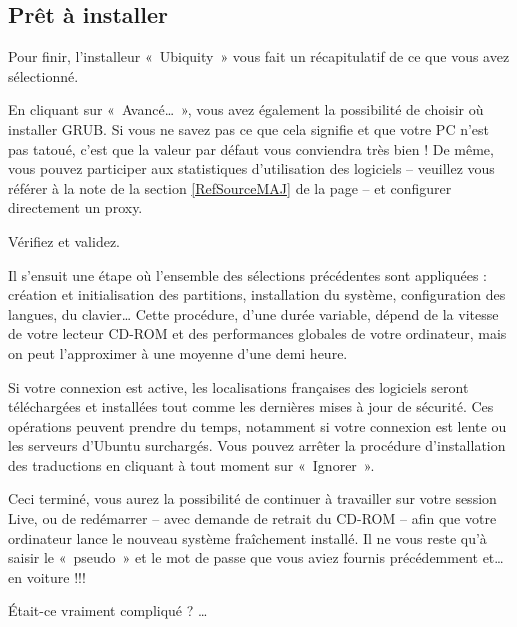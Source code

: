 \subsection{Prêt à installer}
Pour finir, l'installeur «~Ubiquity~» vous fait un récapitulatif de ce que vous avez sélectionné.\par
{}
\begin{nota}
En cliquant sur «~Avancé\dots{}~», vous avez également la possibilité de choisir où installer GRUB. Si vous ne savez pas ce que cela signifie et que votre PC n'est pas tatoué, c'est que la valeur par défaut vous conviendra très bien ! De même, vous pouvez participer aux statistiques d'utilisation des logiciels -- veuillez vous référer à la note de la section \ref{RefSourceMAJ} de la page \pageref{RefSourceMAJ} -- et configurer directement un proxy.
\end{nota}
Vérifiez et validez.\par
Il s'ensuit une étape où l'ensemble des sélections précédentes sont appliquées : création et initialisation des partitions, installation du système, configuration des langues, du clavier\ldots{} Cette procédure, d'une durée variable, dépend de la vitesse de votre lecteur CD-ROM et des performances globales de votre ordinateur, mais on peut l'approximer à une moyenne d'une demi heure.\par
{}
Si votre connexion  est active, les localisations françaises des logiciels seront téléchargées et installées tout comme les dernières mises à jour de sécurité. Ces opérations peuvent prendre du temps, notamment si votre connexion est lente ou les serveurs d'Ubuntu surchargés. Vous pouvez arrêter la procédure d'installation des traductions en cliquant à tout moment sur «~Ignorer~».\par
{}
Ceci terminé, vous aurez la possibilité de continuer à travailler sur votre session Live, ou de redémarrer -- avec demande de retrait du CD-ROM -- afin que votre ordinateur lance le nouveau système fraîchement installé. Il ne vous reste qu'à saisir le «~pseudo~» et le mot de passe que vous aviez fournis précédemment et\ldots{} en voiture !!!\par
{}
Était-ce vraiment compliqué ? \ldots{}
